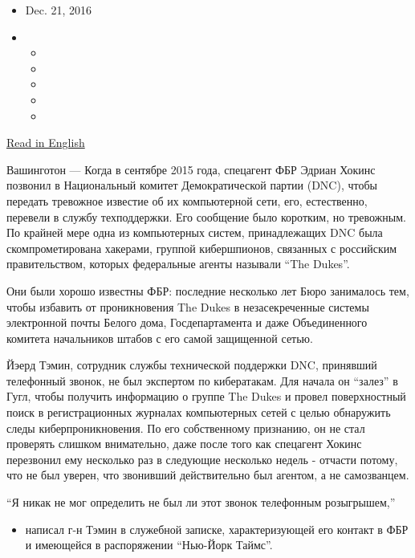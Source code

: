 \begin{itemize}
\item
  Dec. 21, 2016
\item
  \begin{itemize}
  \item
  \item
  \item
  \item
  \item
  \end{itemize}
\end{itemize}

\href{https://www.nytimes3xbfgragh.onion/2016/12/13/us/politics/russia-hack-election-dnc.html}{Read
in English}

Вашинготон --- Когда в сентябре 2015 года, спецагент ФБР Эдриан Хокинс
позвонил в Национальный комитет Демократической партии (DNC), чтобы
передать тревожное известие об их компьютерной сети, его, естественно,
перевели в службу техподдержки. Его сообщение было коротким, но
тревожным. По крайней мере одна из компьютерных систем, принадлежащих
DNC была скомпрометирована хакерами, группой кибершпионов, связанных с
российским правительством, которых федеральные агенты называли ``The
Dukes''.

Они были хорошо известны ФБР: последние несколько лет Бюро занималось
тем, чтобы избавить от проникновения The Dukes в незасекреченные системы
электронной почты Белого дома, Госдепартамента и даже Объединенного
комитета начальников штабов с его самой защищенной сетью.

Йэерд Тэмин, сотрудник службы технической поддержки DNC, принявший
телефонный звонок, не был экспертом по кибератакам. Для начала он
``залез'' в Гугл, чтобы получить информацию о группе The Dukes и провел
поверхностный поиск в регистрационных журналах компьютерных сетей с
целью обнаружить следы киберпроникновения. По его собственному
признанию, он не стал проверять слишком внимательно, даже после того как
спецагент Хокинс перезвонил ему несколько раз в следующие несколько
недель - отчасти потому, что не был уверен, что звонивший действительно
был агентом, а не самозванцем.

``Я никак не мог определить не был ли этот звонок телефонным
розыгрышем,''

\begin{itemize}
\tightlist
\item
  написал г-н Тэмин в служебной записке, характеризующей его контакт в
  ФБР и имеющейся в распоряжении ``Нью-Йорк Таймс''.
\end{itemize}

